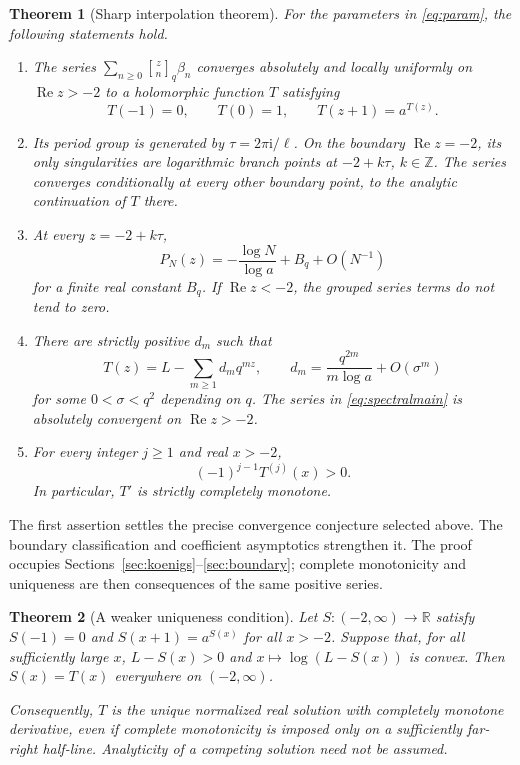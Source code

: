 \documentclass[11pt,letterpaper]{article}
\newtheorem{theorem}{Theorem}[section]
\theoremstyle{definition}\newtheorem{definition}[theorem]{Definition}
\theoremstyle{remark}\newtheorem{remark}[theorem]{Remark}
\newcommand{\R}{\mathbb R}
\newcommand{\qb}[2]{\genfrac{[}{]}{0pt}{}{#1}{#2}_{\!q}}
\newcommand{\Ree}{\operatorname{Re}}
\newcommand{\ii}{\mathrm i}
\numberwithin{equation}{section}
\begin{document}
\begin{theorem}[Sharp interpolation theorem]\label{thm:main}
For the parameters in \eqref{eq:param}, the following statements hold.
\begin{enumerate}[label=(\roman*)]
\item The series $\sum_{n\geq0}\qb zn\beta_n$ converges absolutely and locally uniformly on $\Ree z>-2$ to a holomorphic function $T$ satisfying
\begin{equation}\label{eq:FE}
 T(-1)=0,\qquad T(0)=1,\qquad T(z+1)=a^{T(z)}.
\end{equation}
\item Its period group is generated by $\tau=2\pi\ii/\ell$. On the boundary $\Ree z=-2$, its only singularities are logarithmic branch points at $-2+k\tau$, $k\in\mathbb Z$. The series converges conditionally at every other boundary point, to the analytic continuation of $T$ there.
\item At every $z=-2+k\tau$,
\begin{equation}\label{eq:boundarydiv}
 P_N(z)=-\frac{\log N}{\log a}+B_q+O(N^{-1})
\end{equation}
for a finite real constant $B_q$. If $\Ree z<-2$, the grouped series terms do not tend to zero.
\item There are strictly positive $d_m$ such that
\begin{equation}\label{eq:spectralmain}
 T(z)=L-\sum_{m\geq1}d_m q^{mz},\qquad
 d_m=\frac{q^{2m}}{m\log a}+O(\sigma^m)
\end{equation}
for some $0<\sigma<q^2$ depending on $q$. The series in \eqref{eq:spectralmain} is absolutely convergent on $\Ree z>-2$.
\item For every integer $j\geq1$ and real $x>-2$,
\begin{equation}\label{eq:strictCM}
 (-1)^{j-1}T^{(j)}(x)>0.
\end{equation}
In particular, $T'$ is strictly completely monotone.
\end{enumerate}
\end{theorem}

The first assertion settles the precise convergence conjecture selected above. The boundary classification and coefficient asymptotics strengthen it. The proof occupies Sections~\ref{sec:koenigs}--\ref{sec:boundary}; complete monotonicity and uniqueness are then consequences of the same positive series.

\begin{theorem}[A weaker uniqueness condition]\label{thm:unique-main}
Let $S:(-2,\infty)\to\R$ satisfy $S(-1)=0$ and $S(x+1)=a^{S(x)}$ for all $x>-2$. Suppose that, for all sufficiently large $x$, $L-S(x)>0$ and $x\mapsto\log(L-S(x))$ is convex. Then $S(x)=T(x)$ everywhere on $(-2,\infty)$.

Consequently, $T$ is the unique normalized real solution with completely monotone derivative, even if complete monotonicity is imposed only on a sufficiently far-right half-line. Analyticity of a competing solution need not be assumed.
\end{theorem}
\end{document}
